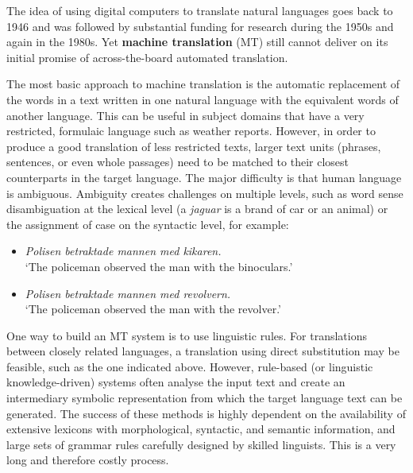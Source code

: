 \begin{multicols}{2}
The idea of using digital computers to translate natural languages
goes back to 1946 and was followed by substantial funding for research
during the 1950s and again in the 1980s. Yet \textbf{machine
  translation} (MT) still cannot deliver on its initial promise of across-the-board automated translation. 


The most basic approach to machine translation is the automatic replacement of the words in a text written in one natural language with the equivalent words of another language. This can be useful in subject domains that have a very restricted, formulaic language such as weather reports. However, in order to produce a good translation of less restricted texts, larger text units (phrases, sentences, or even whole passages) need to be matched to their closest counterparts in the target language. The major difficulty is that human language is ambiguous. Ambiguity creates challenges on multiple levels, such as word sense disambiguation at the lexical level (a \textit{jaguar} is a brand of car or an animal) or the assignment of case on the syntactic level, for example:

\begin{itemize}
\item \textit{Polisen betraktade mannen med kikaren.}
\\`The policeman observed the man with the binoculars.'
\item \textit{Polisen betraktade mannen med revolvern.}
\\`The policeman observed the man with the revolver.'
\end{itemize}

One way to build an MT system is to use linguistic rules. For translations between closely related languages, a translation using direct substitution may be feasible, such as the one indicated above. However, rule-based (or linguistic knowledge-driven) systems often analyse the input text and create an intermediary symbolic representation from which the target language text can be generated. The success of these methods is highly dependent on the availability of extensive lexicons with morphological, syntactic, and semantic information, and large sets of grammar rules carefully designed by skilled linguists. This is a very long and therefore costly process.


\end{multicols}
